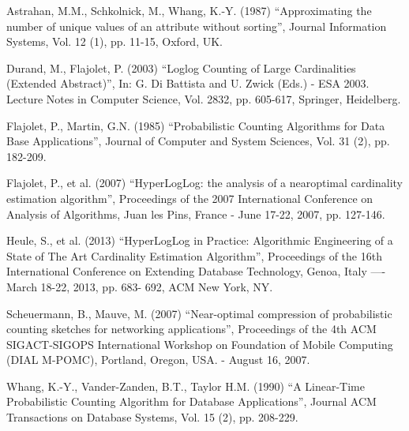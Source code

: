 \documentclass[a4paper,13pt]{article}
\theoremstyle{mytheor}
\begin{document}
\begin{thebibliography}{19}
    \bibitem
    [As87] Astrahan, M.M., Schkolnick, M., Whang, K.-Y. (1987)
    “Approximating the number of unique values of an attribute without
    sorting”, Journal Information Systems, Vol. 12 (1), pp. 11-15,
    Oxford, UK.
    
    \bibitem[Du03] Durand, M., Flajolet, P. (2003) “Loglog Counting of Large
    Cardinalities (Extended Abstract)”, In: G. Di Battista and U.
    Zwick (Eds.) - ESA 2003. Lecture Notes in Computer Science, Vol.
    2832, pp. 605-617, Springer, Heidelberg.
    
    \bibitem[Fl85] Flajolet, P., Martin, G.N. (1985) “Probabilistic Counting
    Algorithms for Data Base Applications”, Journal of Computer and
    System Sciences, Vol. 31 (2), pp. 182-209.
    
    \bibitem[Fl07] Flajolet, P., et al. (2007) “HyperLogLog: the analysis of a nearoptimal cardinality estimation algorithm”, Proceedings of the 2007
    International Conference on Analysis of Algorithms, Juan les Pins,
    France - June 17-22, 2007, pp. 127-146.
    
    \bibitem[He13] Heule, S., et al. (2013) “HyperLogLog in Practice: Algorithmic
    Engineering of a State of The Art Cardinality Estimation Algorithm”, Proceedings of the 16th International Conference on Extending
    Database Technology, Genoa, Italy —- March 18-22, 2013, pp. 683-
    692, ACM New York, NY.
    
    \bibitem[Sc07] Scheuermann, B., Mauve, M. (2007) “Near-optimal compression
    of probabilistic counting sketches for networking applications”,
    Proceedings of the 4th ACM SIGACT-SIGOPS International
    Workshop on Foundation of Mobile Computing (DIAL M-POMC),
    Portland, Oregon, USA. - August 16, 2007.
    
    \bibitem[Wh90] Whang, K.-Y., Vander-Zanden, B.T., Taylor H.M. (1990)
    “A Linear-Time Probabilistic Counting Algorithm for Database
    Applications”, Journal ACM Transactions on Database Systems,
    Vol. 15 (2), pp. 208-229.
\end{thebibliography}
\end{document}
